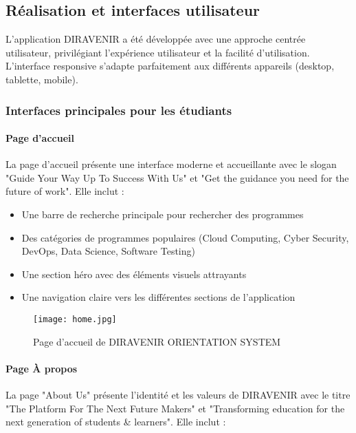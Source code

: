 \documentclass[12pt,a4paper]{report}
\begin{document}
\subsection{Réalisation et interfaces utilisateur}

L'application DIRAVENIR a été développée avec une approche centrée utilisateur, privilégiant l'expérience utilisateur et la facilité d'utilisation. L'interface responsive s'adapte parfaitement aux différents appareils (desktop, tablette, mobile).

\subsubsection{Interfaces principales pour les étudiants}

\paragraph{Page d'accueil}

La page d'accueil présente une interface moderne et accueillante avec le slogan "Guide Your Way Up To Success With Us" et "Get the guidance you need for the future of work". Elle inclut :

\begin{itemize}
    \item Une barre de recherche principale pour rechercher des programmes
    \item Des catégories de programmes populaires (Cloud Computing, Cyber Security, DevOps, Data Science, Software Testing)
    \item Une section héro avec des éléments visuels attrayants
    \item Une navigation claire vers les différentes sections de l'application
\end{itemize}

\begin{figure}[H]
\centering
\texttt{[image: home.jpg]}
\caption{Page d'accueil de DIRAVENIR ORIENTATION SYSTEM}
\label{fig:homepage}
\end{figure}

\paragraph{Page À propos}

La page "About Us" présente l'identité et les valeurs de DIRAVENIR avec le titre "The Platform For The Next Future Makers" et "Transforming education for the next generation of students & learners". Elle inclut :
\end{document}
